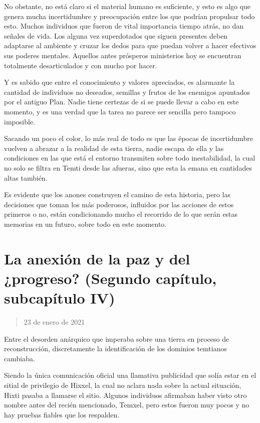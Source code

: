 \documentclass[
  spanish,
]{book}
\begin{document}
No obstante, no está claro si el material humano es suficiente, y esto es algo que genera mucha incertidumbre y preocupación entre los que podrían propulsar todo esto. Muchos individuos que fueron de vital importancia tiempo atrás, no dan señales de vida. Los alguna vez superdotados que siguen presentes deben adaptarse al ambiente y cruzar los dedos para que puedan volver a hacer efectivos sus poderes mentales. Aquellos antes prósperos ministerios hoy se encuentran totalmente desarticulados y con mucho por hacer.

Y es sabido que entre el conocimiento y valores apreciados, es alarmante la cantidad de individuos no deseados, semillas y frutos de los enemigos apuntados por el antiguo Plan. Nadie tiene certezas de si se puede llevar a cabo en este momento, y es una verdad que la tarea no parece ser sencilla pero tampoco imposible.

Sacando un poco el color, lo más real de todo es que las épocas de incertidumbre vuelven a abrazar a la realidad de esta tierra, nadie escapa de ella y las condiciones en las que está el entorno transmiten sobre todo inestabilidad, la cual no solo se filtra en Temti desde las afueras, sino que esta la emana en cantidades altas también.

Es evidente que los anones construyen el camino de esta historia, pero las decisiones que toman los más poderosos, influidos por las acciones de estos primeros o no, están condicionando mucho el recorrido de lo que serán estas memorias en un futuro, sobre todo en este momento.

\hypertarget{la-anexiuxf3n-de-la-paz-y-del-progreso-segundo-capuxedtulo-subcapuxedtulo-iv}{%
\section{La anexión de la paz y del ¿progreso? (Segundo capítulo, subcapítulo IV)}\label{la-anexiuxf3n-de-la-paz-y-del-progreso-segundo-capuxedtulo-subcapuxedtulo-iv}}

\begin{quote}
23 de enero de 2021
\end{quote}

Entre el desorden anárquico que imperaba sobre una tierra en proceso de reconstrucción, discretamente la identificación de los dominios temtianos cambiaba.

Siendo la única comunicación oficial una llamativa publicidad que solía estar en el sitial de privilegio de Hixxel, la cual no aclara nada sobre la actual situación, Hixti pasaba a llamarse el sitio. Algunos individuos afirmaban haber visto otro nombre antes del recién mencionado, Temxel, pero estos fueron muy pocos y no hay pruebas fiables que los respalden.
\end{document}
